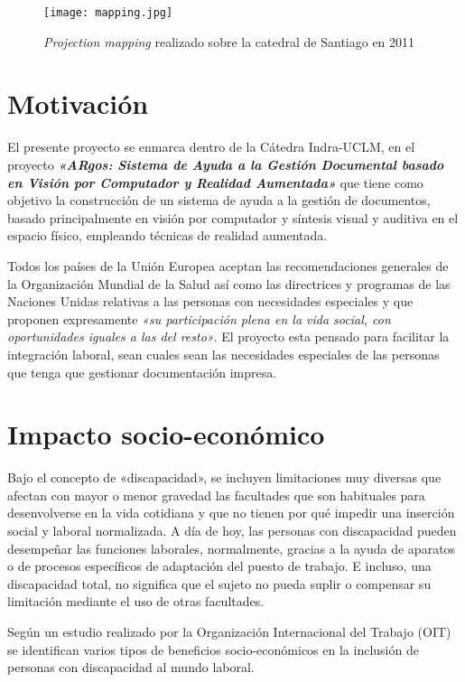 \begin{figure} 
  \centering
  \texttt{[image: mapping.jpg]}
  \caption{\textit{Projection mapping} realizado sobre la catedral de Santiago en 2011}
  \label{fig:mapping}
\end{figure}

\section{Motivación}

El presente proyecto se enmarca dentro de la Cátedra Indra-UCLM, en el proyecto \textbf{\textit{«ARgos: Sistema de Ayuda a la Gestión Documental basado en Visión por Computador y Realidad Aumentada»}} que tiene como objetivo la construcción de un sistema de ayuda a la gestión de documentos, basado principalmente en visión por computador y síntesis visual y auditiva en el espacio físico, empleando técnicas de realidad aumentada. 

Todos los países de la Unión Europea aceptan las recomendaciones generales de la Organización Mundial de la Salud así como las directrices y programas de las Naciones Unidas relativas a las personas con necesidades especiales y que proponen expresamente \textit{«su participación plena en la vida social, con oportunidades iguales a las del resto»}. El proyecto esta pensado para facilitar la integración laboral, sean cuales sean las necesidades especiales de las personas que tenga que gestionar documentación impresa. 
  
\section{Impacto socio-económico}
Bajo el concepto de «discapacidad», se incluyen limitaciones muy diversas que afectan con mayor o menor gravedad las facultades que son habituales para desenvolverse en la vida cotidiana y que no tienen por qué impedir una inserción social y laboral normalizada. A día de hoy, las personas con discapacidad pueden desempeñar las funciones laborales, normalmente, gracias a la ayuda de aparatos o de procesos específicos de adaptación del puesto de trabajo. E incluso, una discapacidad total, no significa que el sujeto no pueda suplir o compensar su limitación mediante el uso de otras facultades. 

Según un estudio \cite{OIT} realizado por la Organización Internacional del Trabajo (OIT) se identifican varios tipos de beneficios socio-económicos en la inclusión de personas con discapacidad al mundo laboral.

